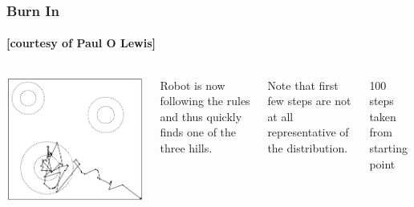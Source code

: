 \begin{frame}
\frametitle{Burn In}
\framesubtitle{[courtesy of Paul O Lewis]}

\begin{columns}


\includegraphics[width=\textwidth]{../images/burnIn}


\small{
Robot is now following the rules and thus quickly finds one of the three hills.

\bigskip{}

Note that first few steps are not at all representative of the distribution.

\bigskip{}

100 steps taken from starting point

}

\end{columns}

\end{frame}

